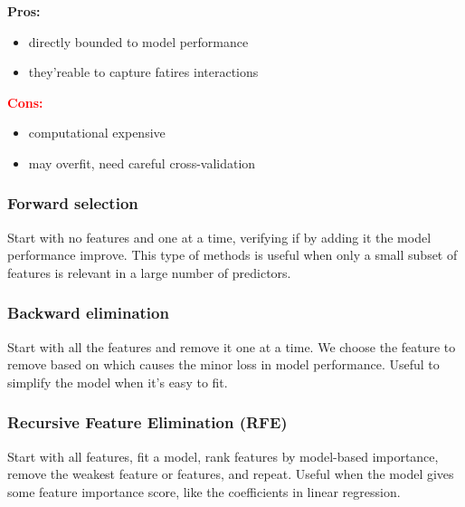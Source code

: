 \begin{minipage}[t]{0.45\textwidth}
  \textcolor{green!60!black}{\textbf{Pros:}}
    \begin{itemize}
        \item directly bounded to model performance
        \item they'reable to capture fatires interactions
    \end{itemize}
\end{minipage}
\begin{minipage}[t]{0.45\textwidth}
    \textcolor{red}{\textbf{Cons:}}
    \begin{itemize}
        \item computational expensive
        \item may overfit, need careful cross-validation
    \end{itemize}
\end{minipage}
    
\subsubsection{Forward selection}
Start with no features and one at a time, verifying if by adding it the model performance improve. This type of methods is useful when only a small subset of features is relevant in a large number of predictors.
\subsubsection{Backward elimination}
Start with all the features and remove it one at a time. We choose the feature to remove based on which causes the minor loss in model performance. Useful to simplify the model when it's easy to fit.
\subsubsection{Recursive Feature Elimination (RFE)}
Start with all features, fit a model, rank features by model-based importance, remove the weakest feature or features, and repeat. Useful when the model gives some feature importance score, like the coefficients in linear regression.

